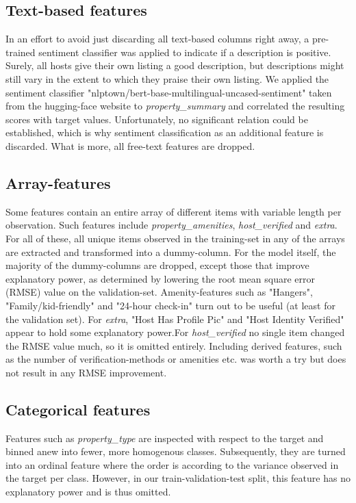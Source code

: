 \documentclass[11pt, oneside]{article}   	%
\begin{document}
\subsection{Text-based features}
In an effort to avoid just discarding all text-based columns right away, a pre-trained sentiment classifier was applied to indicate if a description is positive. Surely, all hosts give their own listing a good description, but descriptions might still vary in the extent to which they praise their own listing. We applied the sentiment classifier "nlptown/bert-base-multilingual-uncased-sentiment" taken from the hugging-face website to \textit{property\_summary} and correlated the resulting scores with target values. Unfortunately, no significant relation could be established, which is why sentiment classification as an additional feature is discarded. What is more, all free-text features are dropped.

\subsection{Array-features}
Some features contain an entire array of different items with variable length per observation. Such features include \textit{property\_amenities}, \textit{host\_verified} and \textit{extra}. For all of these, all unique items observed in the training-set in any of the arrays are extracted and transformed into a dummy-column. For the model itself, the majority of the dummy-columns are dropped, except those that improve explanatory power, as determined by lowering the root mean square error (RMSE) value on the validation-set.\newline
 Amenity-features such as "Hangers", "Family/kid-friendly" and "24-hour check-in" turn out to be useful (at least for the validation set). \newline For \textit{extra}, "Host Has Profile Pic" and "Host Identity Verified" appear to hold some explanatory power.\newline For \textit{host\_verified} no single item changed the RMSE value much, so it is omitted entirely. Including derived features, such as the number of verification-methods or amenities etc. was worth a try but does not result in any RMSE improvement.

\subsection{Categorical features}
Features such as \textit{property\_type} are inspected with respect to the target and binned anew into fewer, more homogenous classes. Subsequently, they are turned into an ordinal feature where the order is according to the variance observed in the target per class. However, in our train-validation-test split, this feature has no explanatory power and is thus omitted.\newline
\end{document}
